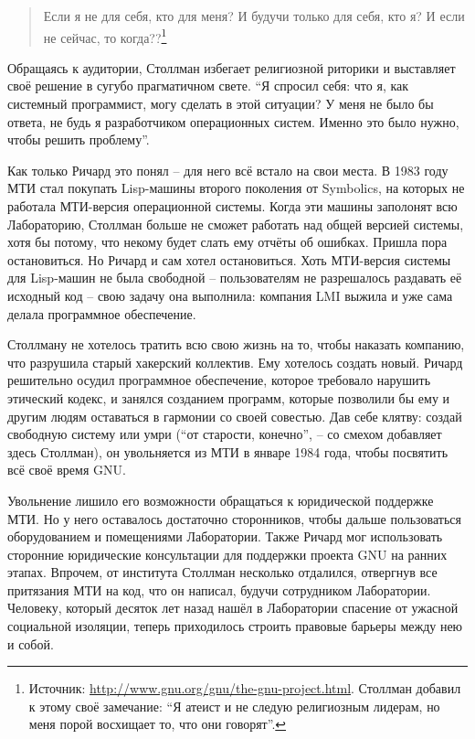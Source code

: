 \begin{quote}
Если я не для себя, кто для меня? И будучи только для себя, кто я? И если не сейчас, то когда??\footnote{Источник: \url{http://www.gnu.org/gnu/the-gnu-project.html}. Столлман добавил к этому своё замечание: \enquote{Я атеист и не следую религиозным лидерам, но меня порой восхищает то, что они говорят}.}
\end{quote}

Обращаясь к аудитории, Столлман избегает религиозной риторики и выставляет своё решение в сугубо прагматичном свете. \enquote{Я спросил себя: что я, как системный программист, могу сделать в этой ситуации? У меня не было бы ответа, не будь я разработчиком операционных систем. Именно это было нужно, чтобы решить проблему}.

Как только Ричард это понял -- для него всё встало на свои места. В 1983 году МТИ стал покупать Lisp-машины второго поколения от Symbolics, на которых не работала МТИ-версия операционной системы. Когда эти машины заполонят всю Лабораторию, Столлман больше не сможет работать над общей версией системы, хотя бы потому, что некому будет слать ему отчёты об ошибках. Пришла пора остановиться. Но Ричард и сам хотел остановиться. Хоть МТИ-версия системы для Lisp-машин не была свободной -- пользователям не разрешалось раздавать её исходный код -- свою задачу она выполнила: компания LMI выжила и уже сама делала программное обеспечение.

Столлману не хотелось тратить всю свою жизнь на то, чтобы наказать компанию, что разрушила старый хакерский коллектив. Ему хотелось создать новый. Ричард решительно осудил программное обеспечение, которое требовало нарушить этический кодекс, и занялся созданием программ, которые позволили бы ему и другим людям оставаться в гармонии со своей совестью. Дав себе клятву: создай свободную систему или умри (\enquote{от старости, конечно}, -- со смехом добавляет здесь Столлман), он увольняется из МТИ в январе 1984 года, чтобы посвятить всё своё время GNU.

Увольнение лишило его возможности обращаться к юридической поддержке МТИ. Но у него оставалось достаточно сторонников, чтобы дальше пользоваться оборудованием и помещениями Лаборатории. Также Ричард мог использовать сторонние юридические консультации для поддержки проекта GNU на ранних этапах. Впрочем, от института Столлман несколько отдалился, отвергнув все притязания МТИ на код, что он написал, будучи сотрудником Лаборатории. Человеку, который десяток лет назад нашёл в Лаборатории спасение от ужасной социальной изоляции, теперь приходилось строить правовые барьеры между нею и собой.

